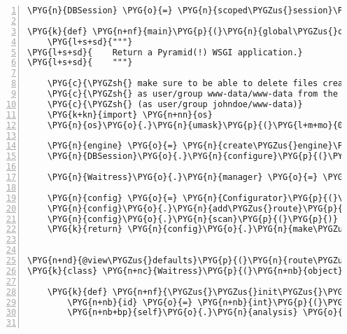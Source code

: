 \begin{Verbatim}[commandchars=\\\{\},numbers=left,firstnumber=1,stepnumber=5]
\PYG{n}{DBSession} \PYG{o}{=} \PYG{n}{scoped\PYGZus{}session}\PYG{p}{(}\PYG{n}{sessionmaker}\PYG{p}{(}\PYG{n}{extension}\PYG{o}{=}\PYG{n}{ZopeTransactionExtension}\PYG{p}{(}\PYG{p}{)}\PYG{p}{)}\PYG{p}{)}

\PYG{k}{def} \PYG{n+nf}{main}\PYG{p}{(}\PYG{n}{global\PYGZus{}config}\PYG{p}{,} \PYG{o}{*}\PYG{o}{*}\PYG{n}{settings}\PYG{p}{)}\PYG{p}{:}
    \PYG{l+s+sd}{"""}
\PYG{l+s+sd}{    Return a Pyramid(!) WSGI application.}
\PYG{l+s+sd}{    """}

    \PYG{c}{\PYGZsh{} make sure to be able to delete files created by webapp}
    \PYG{c}{\PYGZsh{} as user/group www-data/www-data from the command line}
    \PYG{c}{\PYGZsh{} (as user/group johndoe/www-data)}
    \PYG{k+kn}{import} \PYG{n+nn}{os}
    \PYG{n}{os}\PYG{o}{.}\PYG{n}{umask}\PYG{p}{(}\PYG{l+m+mo}{0002}\PYG{p}{)}

    \PYG{n}{engine} \PYG{o}{=} \PYG{n}{create\PYGZus{}engine}\PYG{p}{(}\PYG{n}{rnaseqlyze}\PYG{o}{.}\PYG{n}{db\PYGZus{}url}\PYG{p}{)}
    \PYG{n}{DBSession}\PYG{o}{.}\PYG{n}{configure}\PYG{p}{(}\PYG{n}{bind}\PYG{o}{=}\PYG{n}{engine}\PYG{p}{)}

    \PYG{n}{Waitress}\PYG{o}{.}\PYG{n}{manager} \PYG{o}{=} \PYG{n}{Manager}\PYG{p}{(}\PYG{p}{)}

    \PYG{n}{config} \PYG{o}{=} \PYG{n}{Configurator}\PYG{p}{(}\PYG{n}{settings}\PYG{o}{=}\PYG{n}{settings}\PYG{p}{)}
    \PYG{n}{config}\PYG{o}{.}\PYG{n}{add\PYGZus{}route}\PYG{p}{(}\PYG{l+s}{'}\PYG{l+s}{analyses}\PYG{l+s}{'}\PYG{p}{,} \PYG{l+s}{'}\PYG{l+s}{/analyses/\PYGZob{}id\PYGZcb{}}\PYG{l+s}{'}\PYG{p}{)}
    \PYG{n}{config}\PYG{o}{.}\PYG{n}{scan}\PYG{p}{(}\PYG{p}{)}
    \PYG{k}{return} \PYG{n}{config}\PYG{o}{.}\PYG{n}{make\PYGZus{}wsgi\PYGZus{}app}\PYG{p}{(}\PYG{p}{)}


\PYG{n+nd}{@view\PYGZus{}defaults}\PYG{p}{(}\PYG{n}{route\PYGZus{}name}\PYG{o}{=}\PYG{l+s}{'}\PYG{l+s}{analyses}\PYG{l+s}{'}\PYG{p}{,} \PYG{n}{renderer}\PYG{o}{=}\PYG{l+s}{'}\PYG{l+s}{string}\PYG{l+s}{'}\PYG{p}{)}
\PYG{k}{class} \PYG{n+nc}{Waitress}\PYG{p}{(}\PYG{n+nb}{object}\PYG{p}{)}\PYG{p}{:}

    \PYG{k}{def} \PYG{n+nf}{\PYGZus{}\PYGZus{}init\PYGZus{}\PYGZus{}}\PYG{p}{(}\PYG{n+nb+bp}{self}\PYG{p}{,} \PYG{n}{request}\PYG{p}{)}\PYG{p}{:}
        \PYG{n+nb}{id} \PYG{o}{=} \PYG{n+nb}{int}\PYG{p}{(}\PYG{n}{request}\PYG{o}{.}\PYG{n}{matchdict}\PYG{p}{[}\PYG{l+s}{'}\PYG{l+s}{id}\PYG{l+s}{'}\PYG{p}{]}\PYG{p}{)}
        \PYG{n+nb+bp}{self}\PYG{o}{.}\PYG{n}{analysis} \PYG{o}{=} \PYG{n}{DBSession}\PYG{o}{.}\PYG{n}{query}\PYG{p}{(}\PYG{n}{Analysis}\PYG{p}{)}\PYG{o}{.}\PYG{n}{get}\PYG{p}{(}\PYG{n+nb}{id}\PYG{p}{)}


\end{Verbatim}
